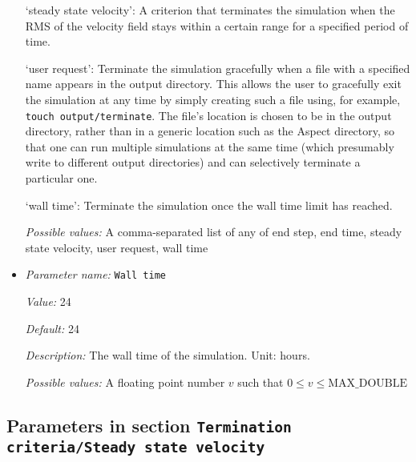 \begin{itemize}
`steady state velocity': A criterion that terminates the simulation when the RMS of the velocity field stays within a certain range for a specified period of time.

`user request': Terminate the simulation gracefully when a file with a specified name appears in the output directory. This allows the user to gracefully exit the simulation at any time by simply creating such a file using, for example, \texttt{touch output/terminate}. The file's location is chosen to be in the output directory, rather than in a generic location such as the Aspect directory, so that one can run multiple simulations at the same time (which presumably write to different output directories) and can selectively terminate a particular one.

`wall time': Terminate the simulation once the wall time limit has reached.


{\it Possible values:} A comma-separated list of any of end step, end time, steady state velocity, user request, wall time
\item {\it Parameter name:} {\tt Wall time}
\label{parameters:Termination criteria/Wall time}


{\it Value:} 24


{\it Default:} 24


{\it Description:} The wall time of the simulation. Unit: hours.


{\it Possible values:} A floating point number $v$ such that $0 \leq v \leq \text{MAX\_DOUBLE}$
\end{itemize}



\subsection{Parameters in section \tt Termination criteria/Steady state velocity}
\label{parameters:Termination_20criteria/Steady_20state_20velocity}

